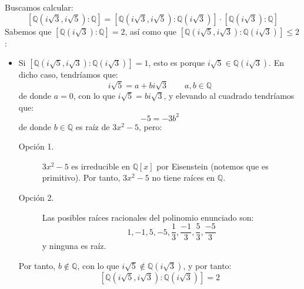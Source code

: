 \begin{ejemplo}
    Buscamos calcular:
    \begin{equation*}
        \left[\mathbb{Q}\left(i\sqrt{3},i\sqrt{5}\right):\mathbb{Q}\right] = \left[\mathbb{Q}\left(i\sqrt{3},i\sqrt{5}\right):\mathbb{Q}\left(i\sqrt{3}\right)\right]\cdot \left[\mathbb{Q}\left(i\sqrt{3}\right):\mathbb{Q}\right]
    \end{equation*}
    Sabemos que $\left[\mathbb{Q}\left(i\sqrt{3}\right):\mathbb{Q}\right] = 2$, así como que $\left[\mathbb{Q}\left(i\sqrt{5},i\sqrt{3}\right):\mathbb{Q}\left(i\sqrt{3}\right)\right]\leq 2$:
    \begin{itemize}
        \item Si $\left[\mathbb{Q}\left(i\sqrt{5},i\sqrt{3}\right):\mathbb{Q}\left(i\sqrt{3}\right)\right]=1$, esto es porque $i\sqrt{5}\in \mathbb{Q}\left(i\sqrt{3}\right)$. En dicho caso, tendríamos que:
            \begin{equation*}
                i\sqrt{5} = a+bi\sqrt{3} \qquad a,b\in \mathbb{Q}
            \end{equation*}
            de donde $a=0$, con lo que $i\sqrt{5}=bi\sqrt{3}$, y elevando al cuadrado tendríamos que:
            \begin{equation*}
                -5 = -3b^2
            \end{equation*}
            de donde $b\in \mathbb{Q}$ es raíz de $3x^2-5$, pero:
            \begin{description}
                \item [Opción 1.] $3x^2-5$ es irreducible en $\mathbb{Q}[x]$ por Eisenstein (notemos que es primitivo). Por tanto, $3x^2-5$ no tiene raíces en $\mathbb{Q}$.
                \item [Opción 2.] Las posibles raíces racionales del polinomio enunciado son:
                    \begin{equation*}
                        1, -1, 5, -5, \frac{1}{3}, \frac{-1}{3}, \frac{5}{3}, \frac{-5}{3}
                    \end{equation*}
                    y ninguna es raíz.
            \end{description}

            Por tanto, $b\notin \mathbb{Q}$, con lo que $i\sqrt{5}\notin \mathbb{Q}\left(i\sqrt{3}\right)$, y por tanto: $$\left[\mathbb{Q}\left(i\sqrt{5},i\sqrt{3}\right):\mathbb{Q}\left(i\sqrt{3}\right)\right] = 2$$
    \end{itemize}


\end{ejemplo}
